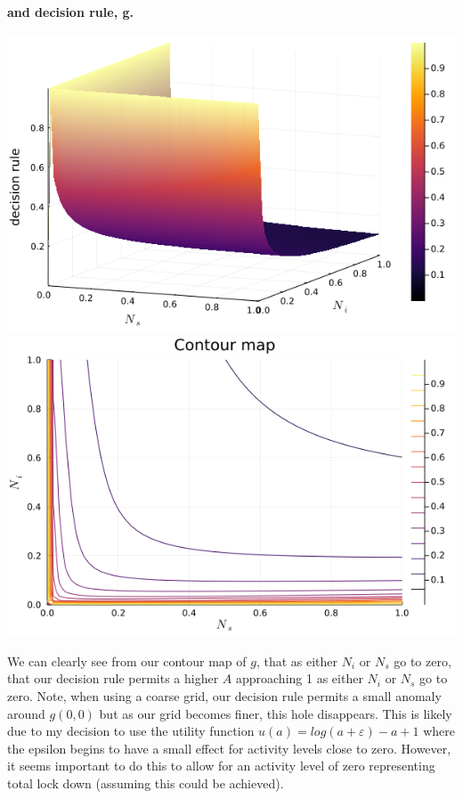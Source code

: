 \documentclass[12pt]{article}
\begin{document}
\newpage

{\bf and decision rule, g.}

\begin{center}
	\includegraphics[width = \textwidth]{../plots/g_surface.png}
	\includegraphics[width = \textwidth]{../plots/g_contour.png}
	\par\medskip
\end{center}

We can clearly see from our contour map of $g$, that as either $N_i$ or $N_s$ go to zero, that our decision rule permits a higher $A$ approaching 1 as either $N_i$ or $N_s$ go to zero.
Note, when using a coarse grid, our decision rule permits a small anomaly around $g(0,0)$ but as our grid becomes finer, this hole disappears. This is likely due to my decision to use the utility function
$u(a) = log(a + \varepsilon) - a + 1$ where the epsilon begins to have a small effect for activity levels close to zero. However, it seems important to do this to allow for an activity level of zero 
representing total lock down (assuming this could be achieved).
\end{document}
